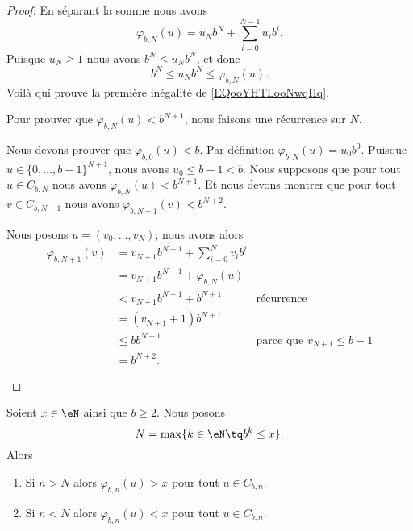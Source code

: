 \begin{proof}
	En séparant la somme nous avons
	\begin{equation}
		\varphi_{b,N}(u)=u_Nb^N+\sum_{i=0}^{N-1}u_ib^i.
	\end{equation}
	Puisque \( u_N\geq 1\) nous avons \( b^N\leq u_Nb^N\), et donc
	\begin{equation}
		b^N\leq u_Nb^N\leq \varphi_{b,N}(u).
	\end{equation}
	Voilà qui prouve la première inégalité de \eqref{EQooYHTLooNwqIIq}.

	Pour prouver que \( \varphi_{b,N}(u)<b^{N+1}\), nous faisons une récurrence sur \( N\).
	\begin{subproof}
		\spitem[Pour \( N=0\)]
		Nous devons prouver que \( \varphi_{b,0}(u)<b\). Par définition \( \varphi_{b,N}(u)=u_0b^0\). Puisque \( u\in\{ 0,\ldots, b-1 \}^{N+1}\), nous avons \( u_0\leq b-1<b\).
		\spitem[Récurrence]
		Nous supposons que pour tout \( u\in C_{b,N}\) nous avons \( \varphi_{b,N}(u)<b^{N+1}\). Et nous devons montrer que pour tout \( v\in C_{b,N+1}\) nous avons \( \varphi_{b,N+1}(v)<b^{N+2}\).

		Nous posons \( u=(v_0,\ldots, v_N)\); nous avons alors
		\begin{subequations}
			\begin{align}
				\varphi_{b,N+1}(v) & =   v_{N+1}b^{N+1}+\sum_{i=0}^Nv_ib^i                                    \\
				                   & =   v_{N+1}b^{N+1}+\varphi_{b,N}(u)                                      \\
				                   & <   v_{N+1}b^{N+1}+b^{N+1}            & \text{récurrence}                \\
				                   & =   (v_{N+1}+1)b^{N+1}                                                   \\
				                   & \leq  bb^{N+1}                        & \text{parce que }v_{N+1}\leq b-1 \\
				                   & =   b^{N+2}.
			\end{align}
		\end{subequations}
	\end{subproof}
\end{proof}

\begin{lemma}        \label{LEMooKDKJooSkhcJS}
	Soient \( x\in \eN\) ainsi que \( b\geq 2\). Nous posons
	\begin{equation}
		N=\max\{ k\in \eN\tq b^k\leq x \}.
	\end{equation}
	Alors
	\begin{enumerate}
		\item
		      Si \( n>N\) alors \( \varphi_{b,n}(u)>x\) pour tout \( u\in C_{b,n}\).
		\item
		      Si \( n<N\) alors \( \varphi_{b,n}(u)<x\) pour tout \( u\in C_{b,n}\).
	\end{enumerate}
\end{lemma}

